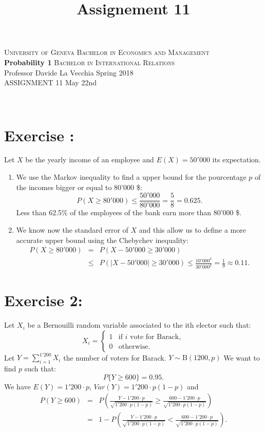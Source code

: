\documentclass[12pt,thmsa]{article}
\title{Assignement 11}
\begin{document}
\noindent \textsc{University of Geneva}     \hfill \textsc{Bachelor in Economics and Management} \\
\textbf{Probability 1}                      \hfill \textsc{Bachelor in International Relations} \\
Professor Davide La Vecchia                 \hfill Spring 2018  \\
ASSIGNMENT 11                               \hfill   May 22nd



\noindent
\makebox[\linewidth]{\rule{\textwidth}{0.4pt}}\\[1.5ex]




\addtocounter{section}{1}
\section*{Exercise \thesection:}

Let $X$ be the yearly income of an employee and $E(X)=50'000$ its expectation.
\begin{enumerate}
  \item We use the Markov inequality to find a upper bound for the pourcentage $p$ of the incomes bigger or equal to 80'000 \$:
  \begin{equation*}
P(X \geq 80'000)\leq \frac{50'000}{80'000}=\frac{5}{8}=0.625.
  \end{equation*}
  Less than 62.5\% of the employees of the bank earn more than 80'000 \$.
  \item We know now the standard error of $X$  and this allow us to define a more accurate upper bound using the Chebychev inequality:
 \begin{eqnarray*}
 P(X\geq 80'000)&=& P(X-50'000\geq 30'000) \\
 &\leq&P(\vert X- 50'000\vert \geq 30'000)\leq \frac{10'000^2}{30'000^2}=\frac{1}{9} \approx 0.11.
 \end{eqnarray*}
\end{enumerate}




\section*{Exercise 2:}

Let $X_i$ be a Bernouilli random variable associated to the ith elector such that:
$$
X_i =\left\{
\begin{array}{ll}
1 & \mbox{if }i \mbox{ vote for Barack},\\
0 & \mbox{otherwise}.
\end{array}
\right.
$$
Let $\displaystyle Y=\sum_{i=1}^{1'200} X_i$ the number of voters for Barack. $Y\sim \mathrm B( 1200, p)$ We want to find $p$ such that:
$$
P\{Y\geq 600\} = 0.95.
$$
We have $E(Y)=1'200\cdot p$, $Var(Y)=1'200\cdot p(1-p)$ and
\begin{eqnarray*}
P (Y\geq 600) &=& P\left(\frac{Y-1'200 \cdot p}{\sqrt{1'200\cdot p(1-p)}} \geq \frac{600
- 1'200\cdot p}{\sqrt{1'200\cdot p(1-p)}}\right)   \\
&=& 1 -P\left(\frac{Y-1'200\cdot p}{\sqrt{1'200\cdot p(1-p)}} < \frac{600
- 1'200\cdot p}{\sqrt{1'200\cdot p(1-p)}}\right).
\end{eqnarray*}
\end{document}
